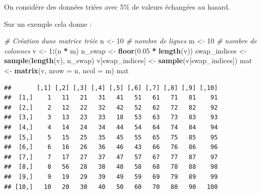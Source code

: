 \documentclass[
]{article}
\newenvironment{Shaded}{\begin{snugshade}}{\end{snugshade}}
\newcommand{\AttributeTok}[1]{\textcolor[rgb]{0.13,0.29,0.53}{#1}}
\newcommand{\CommentTok}[1]{\textcolor[rgb]{0.56,0.35,0.01}{\textit{#1}}}
\newcommand{\DecValTok}[1]{\textcolor[rgb]{0.00,0.00,0.81}{#1}}
\newcommand{\FloatTok}[1]{\textcolor[rgb]{0.00,0.00,0.81}{#1}}
\newcommand{\FunctionTok}[1]{\textcolor[rgb]{0.13,0.29,0.53}{\textbf{#1}}}
\newcommand{\NormalTok}[1]{#1}
\newcommand{\OtherTok}[1]{\textcolor[rgb]{0.56,0.35,0.01}{#1}}
\newcommand{\SpecialCharTok}[1]{\textcolor[rgb]{0.81,0.36,0.00}{\textbf{#1}}}
\begin{document}
On considère des données triées avec 5\% de valeurs échangées au hasard.

Sur un exemple cela donne :

\begin{Shaded}
\begin{Highlighting}[]
\CommentTok{\# Création d\textquotesingle{}une matrice triée}
\NormalTok{n }\OtherTok{\textless{}{-}} \DecValTok{10}  \CommentTok{\# nombre de lignes}
\NormalTok{m }\OtherTok{\textless{}{-}} \DecValTok{10}  \CommentTok{\# nombre de colonnes}
\NormalTok{v }\OtherTok{\textless{}{-}} \DecValTok{1}\SpecialCharTok{:}\NormalTok{(n }\SpecialCharTok{*}\NormalTok{ m)}
\NormalTok{n\_swap }\OtherTok{\textless{}{-}} \FunctionTok{floor}\NormalTok{(}\FloatTok{0.05} \SpecialCharTok{*} \FunctionTok{length}\NormalTok{(v))}
\NormalTok{swap\_indices }\OtherTok{\textless{}{-}} \FunctionTok{sample}\NormalTok{(}\FunctionTok{length}\NormalTok{(v), n\_swap)}
\NormalTok{v[swap\_indices] }\OtherTok{\textless{}{-}} \FunctionTok{sample}\NormalTok{(v[swap\_indices])}
\NormalTok{mat }\OtherTok{\textless{}{-}} \FunctionTok{matrix}\NormalTok{(v, }\AttributeTok{nrow =}\NormalTok{ n, }\AttributeTok{ncol =}\NormalTok{ m)}
\NormalTok{mat}
\end{Highlighting}
\end{Shaded}

\begin{verbatim}
##       [,1] [,2] [,3] [,4] [,5] [,6] [,7] [,8] [,9] [,10]
##  [1,]    1   11   21   31   41   51   61   71   81    91
##  [2,]    2   12   22   32   42   52   62   72   82    92
##  [3,]    3   13   23   33   18   53   63   73   83    93
##  [4,]    4   14   24   34   44   54   64   74   84    94
##  [5,]    5   15   25   35   45   55   65   75   85    95
##  [6,]    6   16   26   36   46   43   66   76   86    96
##  [7,]    7   17   27   37   47   57   67   77   87    97
##  [8,]    8   56   28   38   48   58   68   78   88    98
##  [9,]    9   19   29   39   49   59   69   79   89    99
## [10,]   10   20   30   40   50   60   70   80   90   100
\end{verbatim}
\end{document}
